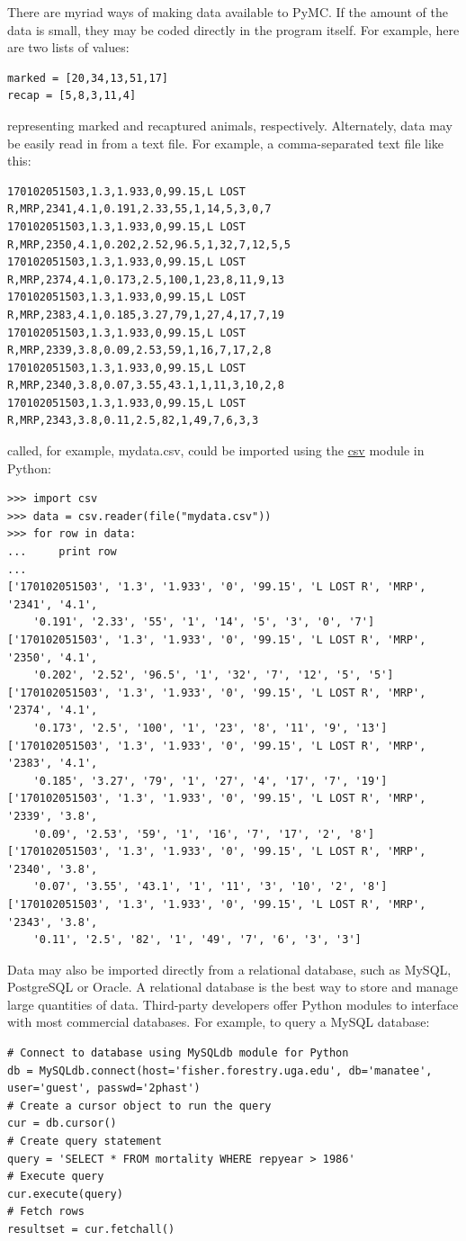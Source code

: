 \documentclass[]{book}
\begin{document}
There are myriad ways of making data available to PyMC. If the amount of the data is small, they may be coded directly in the program itself. For example, here are two lists of values:
\begin{verbatim}
marked = [20,34,13,51,17] 
recap = [5,8,3,11,4]
\end{verbatim}
representing marked and recaptured animals, respectively. Alternately, data may be easily read in from a text file. For example, a comma-separated text file like this:
\begin{verbatim}
170102051503,1.3,1.933,0,99.15,L LOST R,MRP,2341,4.1,0.191,2.33,55,1,14,5,3,0,7
170102051503,1.3,1.933,0,99.15,L LOST R,MRP,2350,4.1,0.202,2.52,96.5,1,32,7,12,5,5
170102051503,1.3,1.933,0,99.15,L LOST R,MRP,2374,4.1,0.173,2.5,100,1,23,8,11,9,13
170102051503,1.3,1.933,0,99.15,L LOST R,MRP,2383,4.1,0.185,3.27,79,1,27,4,17,7,19
170102051503,1.3,1.933,0,99.15,L LOST R,MRP,2339,3.8,0.09,2.53,59,1,16,7,17,2,8
170102051503,1.3,1.933,0,99.15,L LOST R,MRP,2340,3.8,0.07,3.55,43.1,1,11,3,10,2,8
170102051503,1.3,1.933,0,99.15,L LOST R,MRP,2343,3.8,0.11,2.5,82,1,49,7,6,3,3
\end{verbatim}
called, for example, mydata.csv, could be imported using the \href{http://docs.python.org/lib/module-csv.html}{csv} module in Python:
\begin{verbatim}
>>> import csv
>>> data = csv.reader(file("mydata.csv"))
>>> for row in data:
...     print row
... 
['170102051503', '1.3', '1.933', '0', '99.15', 'L LOST R', 'MRP', '2341', '4.1', 
	'0.191', '2.33', '55', '1', '14', '5', '3', '0', '7']
['170102051503', '1.3', '1.933', '0', '99.15', 'L LOST R', 'MRP', '2350', '4.1', 
	'0.202', '2.52', '96.5', '1', '32', '7', '12', '5', '5']
['170102051503', '1.3', '1.933', '0', '99.15', 'L LOST R', 'MRP', '2374', '4.1', 
	'0.173', '2.5', '100', '1', '23', '8', '11', '9', '13']
['170102051503', '1.3', '1.933', '0', '99.15', 'L LOST R', 'MRP', '2383', '4.1', 
	'0.185', '3.27', '79', '1', '27', '4', '17', '7', '19']
['170102051503', '1.3', '1.933', '0', '99.15', 'L LOST R', 'MRP', '2339', '3.8', 
	'0.09', '2.53', '59', '1', '16', '7', '17', '2', '8']
['170102051503', '1.3', '1.933', '0', '99.15', 'L LOST R', 'MRP', '2340', '3.8', 
	'0.07', '3.55', '43.1', '1', '11', '3', '10', '2', '8']
['170102051503', '1.3', '1.933', '0', '99.15', 'L LOST R', 'MRP', '2343', '3.8', 
	'0.11', '2.5', '82', '1', '49', '7', '6', '3', '3']
\end{verbatim}

Data may also be imported directly from a relational database, such as MySQL, PostgreSQL or Oracle. A relational database is the best way to store and manage large quantities of data. Third-party developers offer Python modules to interface with most commercial databases. For example, to query a MySQL database:
\begin{verbatim}
# Connect to database using MySQLdb module for Python
db = MySQLdb.connect(host='fisher.forestry.uga.edu', db='manatee', user='guest', passwd='2phast')
# Create a cursor object to run the query
cur = db.cursor()
# Create query statement
query = 'SELECT * FROM mortality WHERE repyear > 1986'
# Execute query
cur.execute(query)
# Fetch rows
resultset = cur.fetchall()
\end{verbatim}
\end{document}
